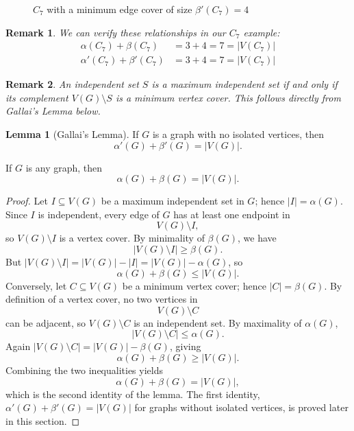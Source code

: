 \documentclass{article}
\newtheorem{remark}{Remark}
\theoremstyle{definition}
\newtheorem{lemma}{Lemma}
\begin{document}
\begin{figure}[h]
\centering
{}
\caption{$C_7$ with a minimum edge cover of size $\beta'(C_7) = 4$}
\label{fig:c7-edge-cover}
\end{figure}

\begin{remark}
We can verify these relationships in our $C_7$ example:
\begin{align}
\alpha(C_7) + \beta(C_7) &= 3 + 4 = 7 = |V(C_7)| \\
\alpha'(C_7) + \beta'(C_7) &= 3 + 4 = 7 = |V(C_7)|
\end{align}
\end{remark}

\begin{remark}
An independent set $S$ is a maximum independent set if and only if its complement $V(G) \setminus S$ is a minimum vertex cover. This follows directly from Gallai's Lemma below.
\end{remark}

\begin{lemma}[Gallai's Lemma]
If $G$ is a graph with no isolated vertices, then
\[\alpha'(G) + \beta'(G) = |V(G)|.\]

If $G$ is any graph, then
\[\alpha(G) + \beta(G) = |V(G)|.\]
\end{lemma}

\begin{proof}
Let $I\subseteq V(G)$ be a maximum independent set in $G$; hence $|I| = \alpha(G)$.  Since $I$ is independent, every edge of $G$ has at least one endpoint in
\[
V(G)\setminus I,
\]
so $V(G)\setminus I$ is a vertex cover.  By minimality of $\beta(G)$, we have
\[
|V(G)\setminus I| \geq \beta(G).
\]
But $|V(G)\setminus I| = |V(G)| - |I| = |V(G)| - \alpha(G)$, so
\[
\alpha(G) + \beta(G) \leq |V(G)|.
\]
Conversely, let $C\subseteq V(G)$ be a minimum vertex cover; hence $|C| = \beta(G)$.  By definition of a vertex cover, no two vertices in
\[
V(G)\setminus C
\]
can be adjacent, so $V(G)\setminus C$ is an independent set.  By maximality of $\alpha(G)$,
\[
|V(G)\setminus C| \leq \alpha(G).
\]
Again $|V(G)\setminus C| = |V(G)| - \beta(G)$, giving
\[
\alpha(G) + \beta(G) \geq |V(G)|.
\]
Combining the two inequalities yields
\[
\alpha(G) + \beta(G) = |V(G)|,
\]
which is the second identity of the lemma. The first identity, $\alpha'(G) + \beta'(G) = |V(G)|$ for graphs without isolated vertices, is proved later in this section.
\end{proof}
\end{document}
